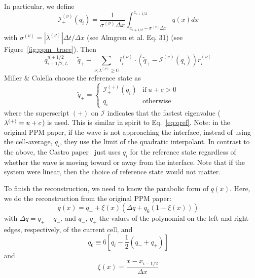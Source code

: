 In particular, we define
\begin{equation}
\mathcal{I}_+^{(\nu)}(q_i) = \frac{1}{\sigma^{(\nu)} \Delta x} \int _{x_{i+1/2} - \sigma^{(\nu)} \Delta x}^{x_{i+1/2}} q(x) dx
\end{equation}
with $\sigma^{(\nu)} = |\lambda^{(\nu)}|\Delta t / \Delta x$ (see Almgren et
al. Eq. 31)  (see Figure~\ref{fig:ppm_trace}).  Then
\begin{equation}
q_{i+1/2,L}^{n+1/2} = \tilde{q}_+ -
   \sum_{\nu;\lambda^{(\nu)}\ge 0} l_i^{(\nu)} \cdot \left (
        \tilde{q}_+ - \mathcal{I}_+^{(\nu)}(q_i)
       \right ) r_i^{(\nu)}  \label{eq:ppmtrace}
\end{equation}
Miller \& Colella choose the reference state as
\begin{equation}
\tilde{q}_+ = \left \{ \begin{array}{cc}
       \mathcal{I}_+^{(+)}(q_i) & \mathrm{if~} u + c > 0 \\
       q_i                    & \mathrm{otherwise}
\end{array}
\right .
\end{equation}
where the superscript $(+)$ on $\mathcal{I}$ indicates that the
fastest eigenvalue ($\lambda^{(+)} = u + c$) is used.  This is similar in
spirit to Eq.~\ref{eq:qref}.  Note: in the original PPM paper, if the
wave is not approaching the interface, instead of using the
cell-average, $q_i$, they use the limit of the quadratic interpolant.
In contrast to the above, the Castro paper~\cite{almgren:2010} just
uses $q_i$ for the reference state regardless of whether the wave is
moving toward or away from the interface.  Note that if the system
were linear, then the choice of reference state would not matter.

To finish the reconstruction, we need to know the parabolic form
of $q(x)$.  Here, we do the reconstruction from the original PPM
paper:
\begin{equation}
q(x) = q_{-} + \xi(x) \left ( \Delta q + q_6 (1 - \xi(x) ) \right )
\end{equation}
with $\Delta q = q_+ - q_-$, and $q_-$, $q_+$ the values of the polynomial
on the left and right edges, respectively, of the current cell, and
\begin{equation}
q_6 \equiv 6 \left [ q_i - \frac{1}{2} (q_- + q_+) \right ]
\end{equation}
and
\begin{equation}
\xi(x) = \frac{x - x_{i-1/2}}{\Delta x}
\end{equation}

